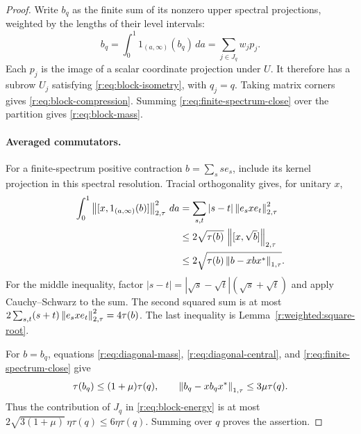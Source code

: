 \begin{proof}
Write \(b_q\) as the finite sum of its nonzero upper spectral
projections, weighted by the lengths of their level intervals:
\begin{equation}\label{r:eq:layer-cake}
 b_q=\int_0^1 1_{(a,\infty)}(b_q)\,da
     =\sum_{j\in J_q}w_jp_j.
\end{equation}
Each \(p_j\) is the image of a scalar coordinate projection under \(U\).
It therefore has a subrow \(U_j\) satisfying
\eqref{r:eq:block-isometry}, with \(q_j=q\).
Taking matrix corners gives \eqref{r:eq:block-compression}.
Summing \eqref{r:eq:finite-spectrum-close} over the partition gives
\eqref{r:eq:block-mass}.

\paragraph{Averaged commutators.}
For a finite-spectrum
positive contraction \(b=\sum_s s e_s\), include its kernel projection
in this spectral resolution. Tracial orthogonality gives, for unitary
\(x\),
\begin{align}
 \int_0^1\left\|[x,1_{(a,\infty)}(b)]\right\|_{2,\tau}^2\,da
 &=\sum_{s,t}|s-t|\left\|e_sxe_t\right\|_{2,\tau}^2\notag\\
 &\leq2\sqrt{\tau(b)}\,\left\|[x,\sqrt b]\right\|_{2,\tau}\notag\\
 &\leq2\sqrt{\tau(b)\left\|b-xbx^*\right\|_{1,\tau}}.
 \label{r:eq:spectral-energy}
\end{align}
For the middle inequality, factor
\(|s-t|=|\sqrt s-\sqrt t|(\sqrt s+\sqrt t)\) and apply
Cauchy--Schwarz to the sum. The second squared sum is at most
\(2\sum_{s,t}(s+t)\left\|e_sxe_t\right\|_{2,\tau}^2=4\tau(b)\).
The last inequality is Lemma~\ref{r:weighted:square-root}.

For \(b=b_q\), equations \eqref{r:eq:diagonal-mass},
\eqref{r:eq:diagonal-central}, and \eqref{r:eq:finite-spectrum-close} give
\[
 \tau(b_q)\leq(1+\mu)\tau(q),\qquad
 \left\|b_q-xb_qx^*\right\|_{1,\tau}\leq3\mu\tau(q).
\]
Thus the contribution of \(J_q\) in \eqref{r:eq:block-energy} is at most
\(2\sqrt{3(1+\mu)}\,\eta\tau(q)\leq6\eta\tau(q)\).
Summing over \(q\) proves the assertion.
\end{proof}
